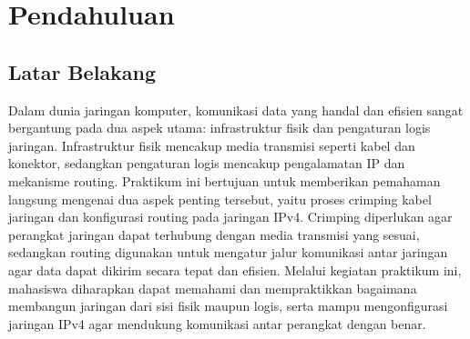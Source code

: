 \section{Pendahuluan}
\subsection{Latar Belakang}
Dalam dunia jaringan komputer, komunikasi data yang handal dan efisien sangat bergantung pada dua aspek utama: infrastruktur fisik dan pengaturan logis jaringan. Infrastruktur fisik mencakup media transmisi seperti kabel dan konektor, sedangkan pengaturan logis mencakup pengalamatan IP dan mekanisme routing. Praktikum ini bertujuan untuk memberikan pemahaman langsung mengenai dua aspek penting tersebut, yaitu proses crimping kabel jaringan dan konfigurasi routing pada jaringan IPv4. Crimping diperlukan agar perangkat jaringan dapat terhubung dengan media transmisi yang sesuai, sedangkan routing digunakan untuk mengatur jalur komunikasi antar jaringan agar data dapat dikirim secara tepat dan efisien. Melalui kegiatan praktikum ini, mahasiswa diharapkan dapat memahami dan mempraktikkan bagaimana membangun jaringan dari sisi fisik maupun logis, serta mampu mengonfigurasi jaringan IPv4 agar mendukung komunikasi antar perangkat dengan benar.

